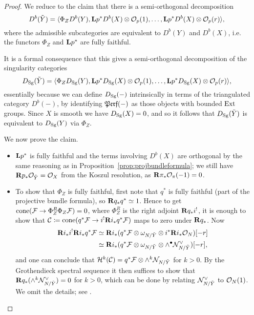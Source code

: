 \begin{proof}
    We reduce to the claim that there is a semi-orthogonal decomposition
    \begin{equation*}
        D^b(\tilde Y)
            = \langle\Phi_ZD^b(Y),
                \mathbf{L} p^*D^b(X)\otimes\mathcal{O}_p(1),\ldots,
                \mathbf{L} p^*D^b(X)\otimes\mathcal{O}_p(r)\rangle,
    \end{equation*}
    where the admissible subcategories are equivalent to $D^b(Y)$ and $D^b(X)$,
    i.e. the functors $\Phi_Z$ and $\mathbf{L} p^*$ are fully faithful.

    It is a formal consequence that this gives a semi-orthogonal decomposition
    of the singularity categories
    \begin{equation*}
        D_{\mathrm{Sg}}(\tilde Y)
            = \langle\Phi_ZD_{\mathrm{Sg}}(Y),
                \mathbf{L} p^*D_{\mathrm{Sg}}(X)\otimes\mathcal{O}_p(1),\ldots,
                \mathbf{L} p^*D_{\mathrm{Sg}}(X)\otimes\mathcal{O}_p(r)\rangle,
    \end{equation*}
    essentially because we can define $D_{\mathrm{Sg}}(-)$ intrinsically in terms of the
    triangulated category $D^b(-)$, by identifying $\operatorname{\mathfrak{Perf}}(-)$ as those objects
    with bounded $\operatorname{Ext}$ groups. Since $X$ is smooth we have $D_{\mathrm{Sg}}(X)=0$, and so
    it follows that $D_{\mathrm{Sg}}(\tilde Y)$ is equivalent to $D_{\mathrm{Sg}}(Y)$ via $\Phi_Z$.

    We now prove the claim.
    \begin{itemize}
        \item $\mathbf{L} p^*$ is fully faithful and the terms involving $D^b(X)$ are
            orthogonal by the same reasoning as in
            Proposition~\ref{prop:projbundleformula}; we still have
            $\mathbf{R} p_*\mathcal{O}_{\tilde Y}=\mathcal{O}_X$ from the Koszul resolution, as
            $\mathbf{R}\pi_*\mathcal{O}_\pi(-1)=0$.

        \item To show that $\Phi_Z$ is fully faithful, first note that $q^*$ is
            fully faithful (part of the projective bundle formula), so
            $\mathbf{R} q_*q^*\simeq1$. Hence to get
            $\operatorname{cone}(\mathcal{F}\to\Phi_Z^R\Phi_Z\mathcal{F})=0$, where $\Phi_Z^R$ is the
            right adjoint $\mathbf{R} q_*i^!$, it is enough to show that
            $\mathcal{C}\coloneqq\operatorname{cone}(q^*\mathcal{F}\to i^!\mathbf{R} i_*q^*\mathcal{F})$ maps to zero
            under $\mathbf{R} q_*$. Now
            \begin{align*}
                \mathbf{R} i_*i^!\mathbf{R} i_*q^*\mathcal{F}
                    &\simeq \mathbf{R} i_*(q^*\mathcal{F}
                        \otimes\omega_{N/\tilde Y}
                        \otimes i^*\mathbf{R} i_*\mathcal{O}_N)[-r] \\
                    &\simeq \mathbf{R} i_*(q^*\mathcal{F}
                        \otimes\omega_{N/\tilde Y}
                        \otimes\wedge^\bullet\mathcal{N}_{N/\tilde Y}^\vee)[-r],
            \end{align*}
            and one can conclude that
            $\mathcal{H}^k(\mathcal{C})=q^*\mathcal{F}\otimes\wedge^k\mathcal{N}_{N/\tilde Y}$ for
            $k>0$. By the Grothendieck spectral sequence it then suffices to
            show that $\mathbf{R} q_*(\wedge^k\mathcal{N}^\vee_{N/\tilde Y})=0$ for $k>0$,
            which can be done by relating $\mathcal{N}^\vee_{N/\tilde Y}$ to
            $\mathcal{O}_N(1)$. We omit the details; see \cite[Prop 1.17]{OrlovKnorrer}.


\end{itemize}
\end{proof}
